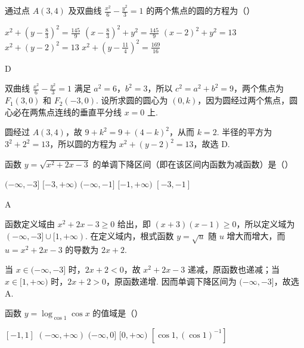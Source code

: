 \begin{problem}

通过点 \(A(3,4) \) 及双曲线 \(\frac{x^{2}}{6}-\frac{y^{2}}{3}=1 \) 的两个焦点的圆的方程为（\quad）

\choicesfive
    {\(x^{2}+\left(y-\frac{8}{3}\right)^{2}=\frac{145}{9} \)}
    {\(\left(x-\frac{8}{3}\right)^{2}+y^{2}=\frac{145}{9} \)}
    {\((x-2)^{2}+y^{2}=13 \)}
    {\(x^{2}+(y-2)^{2}=13 \)}
    {\(x^{2}+\left(y-\frac{11}{4}\right)^{2}=\frac{169}{16}\)}
\end{problem}

\begin{answer}
D
\end{answer}

\begin{solution}
双曲线 \(\frac{x^2}{6}-\frac{y^2}{3}=1\) 满足 \(a^2=6\)，\(b^2=3\)，所以 \(c^2=a^2+b^2=9\)，两个焦点为 \(F_1(3,0)\) 和 \(F_2(-3,0)\). 设所求圆的圆心为 \((0,k)\)，因为圆经过两个焦点，圆心必在两焦点连线的垂直平分线 \(x=0\) 上.

圆经过 \(A(3,4)\)，故
\(9+k^2=9+(4-k)^2\)，从而 \(k=2\). 半径的平方为 \(3^2+2^2=13\)，所以圆的方程为 \(x^2+(y-2)^2=13\)，故选 D.
\end{solution}

\begin{problem}

函数 \(y = \sqrt{x^2 + 2x - 3} \) 的单调下降区间（即在该区间内函数为减函数）是（\quad）

\choicesfive
    {\((-\infty, -3] \)}
    {\([-3, +\infty) \)}
    {\((-\infty, -1] \)}
    {\([-1, +\infty) \)}
    {\([-3, -1] \)}
\end{problem}

\begin{answer}
A
\end{answer}

\begin{solution}
函数定义域由 \(x^2+2x-3\geq0\) 给出，即 \((x+3)(x-1)\geq0\)，所以定义域为 \((-\infty,-3]\cup[1,+\infty)\). 在定义域内，根式函数 \(y=\sqrt{u}\) 随 \(u\) 增大而增大，而 \(u=x^2+2x-3\) 的导数为 \(2x+2\).

当 \(x\in(-\infty,-3]\) 时，\(2x+2<0\)，故 \(x^2+2x-3\) 递减，原函数也递减；当 \(x\in[1,+\infty)\) 时，\(2x+2>0\)，原函数递增. 因而单调下降区间为 \((-\infty,-3]\)，故选 A.
\end{solution}

\begin{problem}

函数 \(y = \log_{\cos 1} \cos x \) 的值域是（\quad）

\choicesfive
    {\([-1,1] \)}
    {\((-\infty,+\infty) \)}
    {\((-\infty,0] \)}
    {\([0,+\infty) \)}
    {\(\left[\cos1,\left(\cos1\right)^{-1}\right] \)}
\end{problem}

